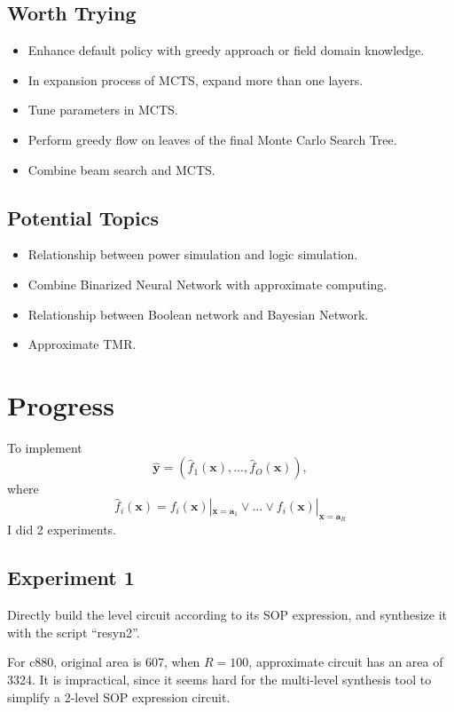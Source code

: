 \documentclass{rpt}
\begin{document}
\subsection{Worth Trying}
\begin{itemize}
    \item Enhance default policy with greedy approach or field domain knowledge.
    \item In expansion process of MCTS, expand more than one layers.
    \item Tune parameters in MCTS\@.
    \item Perform greedy flow on leaves of the final Monte Carlo Search Tree.
    \item Combine beam search and MCTS\@.
\end{itemize}

\subsection{Potential Topics}
\begin{itemize}
    \item Relationship between power simulation and logic simulation.
    \item Combine Binarized Neural Network with approximate computing.
    \item Relationship between Boolean network and Bayesian Network.
    \item Approximate TMR\@.
\end{itemize}

\section{Progress}

To implement
\[
    \mathbf{\hat{y}} = (\hat{f}_1(\mathbf{x}), \ldots, \hat{f}_O(\mathbf{x})),
\]
where
\[
    \hat{f}_i(\mathbf{x}) = f_i(\mathbf{x})|_{\mathbf{x} = \mathbf{a}_1} \lor \ldots \lor f_i(\mathbf{x})|_{\mathbf{x} = \mathbf{a}_R}
\]
I did 2 experiments.

\subsection{Experiment 1}
Directly build the level circuit according to its SOP expression,
and synthesize it with the script ``resyn2''.

For c880, original area is 607,
when $R=100$, approximate circuit has an area of 3324.
It is impractical,
since it seems hard for the multi-level synthesis tool to simplify a 2-level SOP expression circuit.
\end{document}
